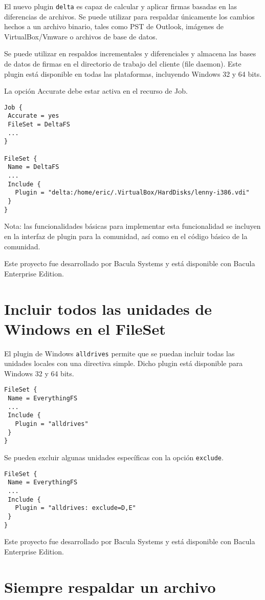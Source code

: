 El nuevo plugin \texttt{delta} es capaz de calcular y aplicar firmas basadas en las 
diferencias de archivos. Se puede utilizar para respaldar únicamente los cambios 
hechos a un archivo binario, tales como PST de Outlook, imágenes de 
VirtualBox/Vmware o archivos de base de datos.

Se puede utilizar en respaldos incrementales y diferenciales y almacena las bases de 
datos de firmas en el directorio de trabajo del cliente (file daemon). Este plugin 
está disponible en todas las plataformas, incluyendo Windows 32 y 64 bits.

La opción Accurate debe estar activa en el recurso de Job.
\begin{verbatim}
Job {
 Accurate = yes
 FileSet = DeltaFS
 ...
}

FileSet {
 Name = DeltaFS
 ...
 Include {
   Plugin = "delta:/home/eric/.VirtualBox/HardDisks/lenny-i386.vdi"
 }
}
\end{verbatim}

Nota: las funcionalidades básicas para implementar esta funcionalidad se incluyen 
en la interfaz de plugin para la comunidad, así como en el código básico de la comunidad.

Este proyecto fue desarrollado por Bacula Systems y está disponible con Bacula 
Enterprise Edition.

\section{Incluir todos las unidades de Windows en el FileSet}

El plugin de Windows \texttt{alldrives} permite que se puedan incluir todas las unidades 
locales con una directiva simple. Dicho plugin está disponible para Windows 32 y 64 bits.

\begin{verbatim}
FileSet {
 Name = EverythingFS
 ...
 Include {
   Plugin = "alldrives"
 }
}
\end{verbatim}

Se pueden excluir algunas unidades específicas con la opción \texttt{exclude}.

\begin{verbatim}
FileSet {
 Name = EverythingFS
 ...
 Include {
   Plugin = "alldrives: exclude=D,E"
 }
}
\end{verbatim}


Este proyecto fue desarrollado por Bacula Systems y está disponible con Bacula 
Enterprise Edition.


\section{Siempre respaldar un archivo}

